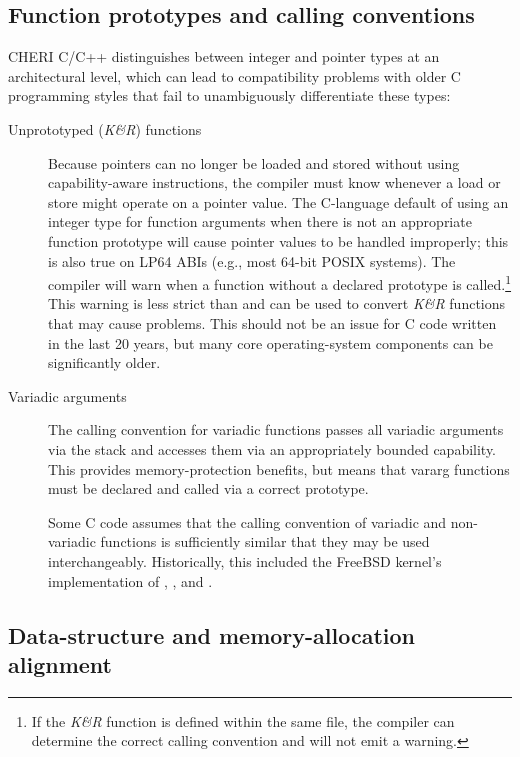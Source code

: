 \documentclass[12pt,twoside,openright,a4paper]{article}
\newcommand{\ccode}[1]{{\small\ttfamily{#1}}}
\newcommand{\cfunc}[1]{{\ccode{#1()}}}
\newcommand{\commandline}[1]{{\ccode{#1}}}
\newcommand{\note}[2]{{\color{blue}[ Note: #1 - #2]}}
\renewcommand{\note}[2]{\relax\ifhmode\unskip\fi}
\newcommand{\rwnote}[1]{\note{#1}{Robert W.}}
\begin{document}
\subsection{Function prototypes and calling conventions}

CHERI C/C++ distinguishes between integer and pointer types at an
architectural level, which can lead to compatibility problems with older C
programming styles that fail to unambiguously differentiate these types:

\begin{description}
\item[Unprototyped (\textit{K\&R}) functions] Because pointers can no longer
  be loaded and stored without using capability-aware instructions, the
  compiler must know whenever a load or store might operate on a pointer
  value.
  The C-language default of using an integer type for function arguments when
  there is not an appropriate function prototype will cause pointer values to
  be handled improperly; this is also true on LP64 ABIs (e.g., most 64-bit
  POSIX systems).
  The compiler will warn when a function without a declared prototype is
  called.\footnote{If the \textit{K\&R} function is defined within the same
  file, the compiler can determine the correct calling convention and will not
  emit a warning.}
  This warning is less strict than \commandline{-Wstrict-prototypes} and can be
  used to convert \textit{K\&R} functions that may cause problems.
  This should not be an issue for C code written in the last 20 years, but
  many core operating-system components can be significantly older.

\item[Variadic arguments] The calling convention for variadic functions
  passes all variadic arguments via the stack and accesses them via an
  appropriately bounded capability.
  This provides memory-protection benefits, but means that vararg functions
  must be declared and called via a correct prototype.

  Some C code assumes that the calling convention of variadic and non-variadic
  functions is sufficiently similar that they may be used interchangeably.
  Historically, this included the FreeBSD kernel's implementation of
  \cfunc{open}, \cfunc{fcntl}, and \cfunc{syscall}.

  \rwnote{I wonder if we need to be more specific with an example here.}

\end{description}

\subsection{Data-structure and memory-allocation alignment}
\end{document}
